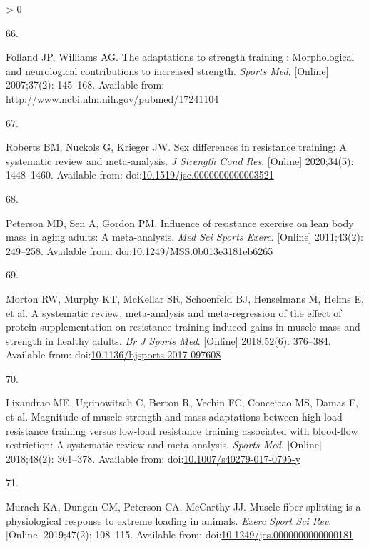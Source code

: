 \documentclass[twoside,10pt]{gihclass} %
\newlength{\cslhangindent}
\newlength{\csllabelwidth}
\newenvironment{CSLReferences}[3] %
 {%
  \setlength{\parindent}{0pt}
  \ifodd #1 \everypar{\setlength{\hangindent}{\cslhangindent}}\ignorespaces\fi
  \ifnum #2 > 0
  \setlength{\parskip}{#2\baselineskip}
  \fi
 }%
 {}
\newcommand{\CSLLeftMargin}[1]{\parbox[t]{\maxof{\widthof{#1}}{\csllabelwidth}}{#1}}
\newcommand{\CSLRightInline}[1]{\parbox[t]{\linewidth}{#1}}
\begin{document}
\begin{CSLReferences}{0}{0}
\leavevmode\hypertarget{ref-RN767}{}%
\CSLLeftMargin{66. }
\CSLRightInline{Folland JP, Williams AG. The adaptations to strength training : Morphological and neurological contributions to increased strength. \emph{Sports Med}. {[}Online{]} 2007;37(2): 145--168. Available from: \url{http://www.ncbi.nlm.nih.gov/pubmed/17241104}}

\leavevmode\hypertarget{ref-RN2740}{}%
\CSLLeftMargin{67. }
\CSLRightInline{Roberts BM, Nuckols G, Krieger JW. Sex differences in resistance training: A systematic review and meta-analysis. \emph{J Strength Cond Res}. {[}Online{]} 2020;34(5): 1448--1460. Available from: doi:\href{https://doi.org/10.1519/jsc.0000000000003521}{10.1519/jsc.0000000000003521}}

\leavevmode\hypertarget{ref-RN752}{}%
\CSLLeftMargin{68. }
\CSLRightInline{Peterson MD, Sen A, Gordon PM. Influence of resistance exercise on lean body mass in aging adults: A meta-analysis. \emph{Med Sci Sports Exerc}. {[}Online{]} 2011;43(2): 249--258. Available from: doi:\href{https://doi.org/10.1249/MSS.0b013e3181eb6265}{10.1249/MSS.0b013e3181eb6265}}

\leavevmode\hypertarget{ref-RN2199}{}%
\CSLLeftMargin{69. }
\CSLRightInline{Morton RW, Murphy KT, McKellar SR, Schoenfeld BJ, Henselmans M, Helms E, et al. A systematic review, meta-analysis and meta-regression of the effect of protein supplementation on resistance training-induced gains in muscle mass and strength in healthy adults. \emph{Br J Sports Med}. {[}Online{]} 2018;52(6): 376--384. Available from: doi:\href{https://doi.org/10.1136/bjsports-2017-097608}{10.1136/bjsports-2017-097608}}

\leavevmode\hypertarget{ref-RN2745}{}%
\CSLLeftMargin{70. }
\CSLRightInline{Lixandrao ME, Ugrinowitsch C, Berton R, Vechin FC, Conceicao MS, Damas F, et al. Magnitude of muscle strength and mass adaptations between high-load resistance training versus low-load resistance training associated with blood-flow restriction: A systematic review and meta-analysis. \emph{Sports Med}. {[}Online{]} 2018;48(2): 361--378. Available from: doi:\href{https://doi.org/10.1007/s40279-017-0795-y}{10.1007/s40279-017-0795-y}}

\leavevmode\hypertarget{ref-RN2741}{}%
\CSLLeftMargin{71. }
\CSLRightInline{Murach KA, Dungan CM, Peterson CA, McCarthy JJ. Muscle fiber splitting is a physiological response to extreme loading in animals. \emph{Exerc Sport Sci Rev}. {[}Online{]} 2019;47(2): 108--115. Available from: doi:\href{https://doi.org/10.1249/jes.0000000000000181}{10.1249/jes.0000000000000181}}


\end{CSLReferences}
\end{document}
